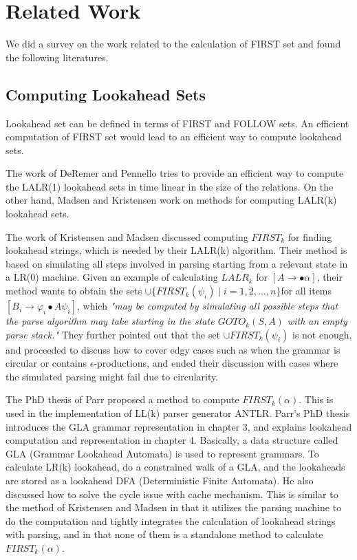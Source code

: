 \documentclass{sig-alternate-05-2015}
\begin{document}
\section{Related Work}
We did a survey on the work related to the calculation of FIRST set and found the following literatures.

\subsection{Computing Lookahead Sets}
Lookahead set can be defined in terms of FIRST and FOLLOW sets. An efficient computation of FIRST set would lead to an efficient way to compute lookahead sets.

The work of DeRemer and Pennello\cite{DeRemer82lalr} tries to provide an efficient way to compute the LALR(1) lookahead sets in time linear in the size of the relations. 
On the other hand, Madsen and Kristensen\cite{kristensen81lalr} work on methods for computing LALR(k) lookahead sets.

The work of Kristensen and Madsen \cite{kristensen81lalr} discussed computing
$FIRST_k$ for finding lookahead strings, which is needed by
their LALR(k) algorithm. Their method is based on simulating
all steps involved in parsing starting from a relevant
state in a LR(0) machine. Given an example of calculating
$LALR_k$ for $[A\rightarrow \bullet \alpha]$, their method wants to obtain the
sets $\cup \{FIRST_k(\psi_i) \mid i = 1,2, …, n\} $for all items 
$[B_i\rightarrow \varphi_i \bullet A \psi_i]$, which 
\textit{"may be computed by simulating all possible
steps that the parse algorithm may take starting in the state
$GOTO_k(S, A)$ with an empty parse stack."}
They further
pointed out that the set $\cup {FIRST_k(\psi_i)}$ is not enough, and
proceeded to discuss how to cover edgy cases such as when
the grammar is circular or contains $\epsilon$-productions, and
ended their discussion with cases where the simulated parsing
might fail due to circularity.


The PhD thesis of Parr \cite{parr93ll} proposed a method to compute
$FIRST_k(\alpha)$. This is used in the implementation of LL(k)
parser generator ANTLR. Parr’s PhD thesis introduces the
GLA grammar representation in chapter 3, and explains
lookahead computation and representation in chapter 4.
Basically, a data structure called GLA (Grammar
Lookahead Automata) is used to represent grammars. To
calculate LR(k) lookahead, do a constrained walk of a
GLA, and the lookaheads are stored as a lookahead DFA
(Deterministic Finite Automata). He also discussed how to
solve the cycle issue with cache mechanism.
This is similar to the method of Kristensen and Madsen
in that it utilizes the parsing machine to do the computation
and tightly integrates the calculation of lookahead strings
with parsing, and in that none of them is a standalone
method to calculate $FIRST_k(\alpha)$.
\end{document}
